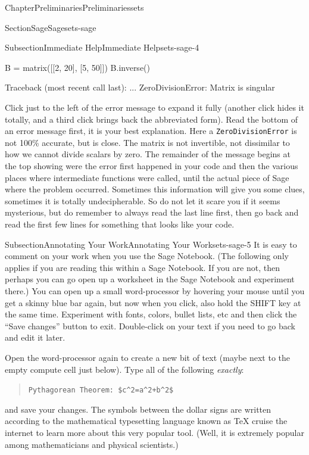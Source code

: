 \documentclass[oneside,10pt,]{book}
\newcommand{\mono}[1]{\texttt{#1}}
\numberwithin{equation}{section}
\begin{document}
\begin{chapterptx}{Chapter}{Preliminaries}{}{Preliminaries}{}{}{sets}
\begin{sectionptx}{Section}{Sage}{}{Sage}{}{}{sets-sage}
\begin{subsectionptx}{Subsection}{Immediate Help}{}{Immediate Help}{}{}{sets-sage-4}
\begin{sageinput}
B = matrix([[2, 20], [5, 50]])
B.inverse()
\end{sageinput}
\begin{sageoutput}
Traceback (most recent call last):
...
ZeroDivisionError: Matrix is singular
\end{sageoutput}
Click just to the left of the error message to expand it fully (another click hides it totally, and a third click brings back the abbreviated form).  Read the bottom of an error message first, it is your best explanation.  Here a \mono{ZeroDivisionError} is not 100\% accurate, but is close.  The matrix is not invertible, not dissimilar to how we cannot divide scalars by zero.  The remainder of the message begins at the top showing were the error first happened in your code and then the various places where intermediate functions were called, until the actual piece of Sage where the problem occurred.  Sometimes this information will give you some clues, sometimes it is totally undecipherable.  So do not let it scare you if it seems mysterious, but do remember to always read the last line first, then go back and read the first few lines for something that looks like your code.%
\end{subsectionptx}
%
%
\typeout{************************************************}
\typeout{************************************************}
%
\begin{subsectionptx}{Subsection}{Annotating Your Work}{}{Annotating Your Work}{}{}{sets-sage-5}
It is easy to comment on your work when you use the Sage Notebook. (The following only applies if you are reading this within a Sage Notebook.  If you are not, then perhaps you can go open up a worksheet in the Sage Notebook and experiment there.)  You can open up a small word-processor by hovering your mouse until you get a skinny blue bar again, but now when you click, also hold the SHIFT key at the same time.  Experiment with fonts, colors, bullet lists, etc and then click the ``Save changes'' button to exit.  Double-click on your text if you need to go back and edit it later.%
\par
Open the word-processor again to create a new bit of text (maybe next to the empty compute cell just below).  Type all of the following \emph{exactly}:%
\begin{quote}%
\mono{Pythagorean Theorem: \$c\textasciicircum{}2=a\textasciicircum{}2+b\textasciicircum{}2\$}%
\end{quote}
and save your changes.  The symbols between the dollar signs are written according to the mathematical typesetting language known as \TeX{} \textemdash{} cruise the internet to learn more about this very popular tool. (Well, it is extremely popular among mathematicians and physical scientists.)%

\end{subsectionptx}
\end{sectionptx}
\end{chapterptx}
\end{document}
